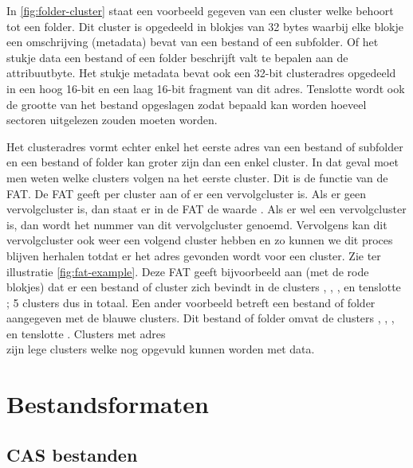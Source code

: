 In \cref{fig:folder-cluster} staat een voorbeeld gegeven van een cluster welke behoort tot een folder. Dit cluster is opgedeeld in blokjes van 32 bytes waarbij elke blokje een omschrijving (metadata) bevat van een bestand of een subfolder. Of het stukje data een bestand of een folder beschrijft valt te bepalen aan de attribuutbyte. Het stukje metadata bevat ook een 32-bit clusteradres opgedeeld in een hoog 16-bit en een laag 16-bit fragment van dit adres. Tenslotte wordt ook de grootte van het bestand opgeslagen zodat bepaald kan worden hoeveel sectoren uitgelezen zouden moeten worden. 

Het clusteradres vormt echter enkel het eerste adres van een bestand of subfolder en een bestand of folder kan groter zijn dan een enkel cluster. In dat geval moet men weten welke clusters volgen na het eerste cluster. Dit is de functie van de FAT. De FAT geeft per cluster aan of er een vervolgcluster is. Als er geen vervolgcluster is, dan staat er in de FAT de waarde . Als er wel een vervolgcluster is, dan wordt het nummer van dit vervolgcluster genoemd. Vervolgens kan dit vervolgcluster ook weer een volgend cluster hebben en zo kunnen we dit proces blijven herhalen totdat er het adres  gevonden wordt voor een cluster. Zie ter illustratie \cref{fig:fat-example}. Deze FAT geeft bijvoorbeeld aan (met de rode blokjes) dat er een bestand of cluster zich bevindt in de clusters , , ,  en tenslotte\\ ; 5 clusters dus in totaal. Een ander voorbeeld betreft een bestand of folder aangegeven met de blauwe clusters. Dit bestand of folder omvat de clusters , , ,  en tenslotte . Clusters met adres \\ zijn lege clusters welke nog opgevuld kunnen worden met data.

%
%
%
\section{Bestandsformaten}

\subsection{CAS bestanden}
\label{sec:cas-files}


